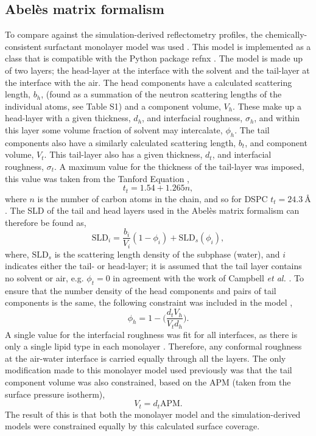 \documentclass[amsmath,amssymb,twocolumn,superscriptaddress]{revtex4-1}
\begin{document}
\subsection{Abel\`{e}s matrix formalism}
To compare against the simulation-derived reflectometry profiles, the
chemically-consistent surfactant monolayer model was
used \cite{mccluskey_bayesian_2019,mccluskey_lipids_at_airdes_2019}.
This model is implemented as a class that is compatible with the Python
package refnx \cite{nelson_refnx_2019,nelson_refnx_2018}.
The model is made up of two layers; the head-layer at the interface with
the solvent and the tail-layer at the interface with the air.
The head components have a calculated scattering length, $b_h$, (found as a
summation of the neutron scattering lengths of the individual atoms, see
Table S1) and a component volume, $V_h$.
These make up a head-layer with a given thickness, $d_h$, and interfacial
roughness, $\sigma_h$, and within this layer some volume fraction of
solvent may intercalate, $\phi_h$.
The tail components also have a similarly calculated scattering
length, $b_t$, and component volume, $V_t$.
This tail-layer also has a given thickness, $d_t$, and interfacial
roughness, $\sigma_t$.
A maximum value for the thickness of the tail-layer was imposed, this
value was taken from the Tanford Equation \cite{tanford_hydrophobic_1980},
%
\begin{equation}
  t_t = 1.54 + 1.265n,
\end{equation}
%
where $n$ is the number of carbon atoms in the chain, and so for
DSPC $t_t = \SI{24.3}{\angstrom}$.
The SLD of the tail and head layers used in the Abel\`{e}s matrix formalism
can therefore be found as,
%
\begin{equation}
  \text{SLD}_i = \frac{b_i}{V_i}(1 - \phi_i) + \text{SLD}_s(\phi_i),
\end{equation}
%
where, $\text{SLD}_s$ is the scattering length density of the subphase
(water), and $i$ indicates either the tail- or head-layer; it is assumed
that the tail layer contains no solvent or air, e.g. $\phi_t = 0$ in
agreement with the work of
Campbell \emph{et al.} \cite{campbell_structure_2018}.
To ensure that the number density of the head components and pairs of tail
components is the same, the following constraint was included in the
model \cite{Braun2017},
%
\begin{equation}
  \phi_h = 1 - \bigg(\frac{d_tV_h}{V_td_h}\bigg).
\end{equation}
%
A single value for the interfacial roughness was fit for all interfaces, as
there is only a single lipid type in each
monolayer \cite{campbell_structure_2018}.
Therefore, any conformal roughness at the air-water interface is carried
equally through all the layers.
The only modification made to this monolayer model used previously was that
the tail component volume was also constrained, based on the APM (taken
from the surface pressure isotherm),
%
\begin{equation}
  V_t = d_t \text{APM}.
\end{equation}
%
The result of this is that both the monolayer model and the
simulation-derived models were constrained equally by this calculated
surface coverage.
\end{document}
